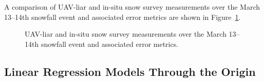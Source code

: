 \documentclass[
  letterpaper,
  DIV=11,
  numbers=noendperiod]{scrartcl}
\begin{document}
A comparison of UAV-liar and in-situ snow survey measurements over the
March 13--14th snowfall event and associated error metrics are shown in
Figure~\ref{fig-lidar-vs-fsd-sd}.

\begin{figure}[H]


\caption{\label{fig-lidar-vs-fsd-sd}UAV-liar and in-situ snow survey
measurements over the March 13--14th snowfall event and associated error
metrics.}

\end{figure}%

\subsection{Linear Regression Models Through the
Origin}\label{linear-regression-models-through-the-origin}
\end{document}
